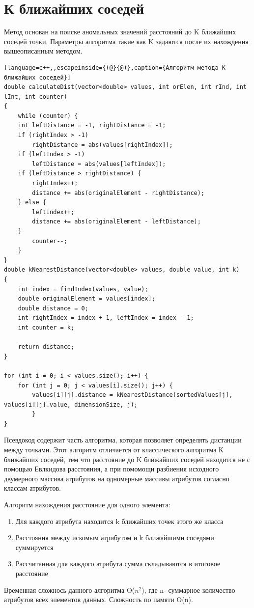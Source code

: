 \section{К ближайших соседей}
Метод основан на поиске аномальных значений расстояний до K ближайших соседей точки. Параметры алгоритма такие как K задаются после их нахождения вышеописанным методом.
\begin{lstlisting}[language=c++,,escapeinside={(@}{@)},caption={Алгоритм метода К ближайших соседей}] 
double calculateDist(vector<double> values, int orElen, int rInd, int lInt, int counter)
{
	while (counter) {
	int leftDistance = -1, rightDistance = -1;
	if (rightIndex > -1)
		rightDistance = abs(values[rightIndex]);
	if (leftIndex > -1)
		leftDistance = abs(values[leftIndex]);
	if (leftDistance > rightDistance) {
		rightIndex++;
		distance += abs(originalElement - rightDistance);
	} else {
		leftIndex++;
		distance += abs(originalElement - leftDistance);
	}
		counter--;
	}
}
double kNearestDistance(vector<double> values, double value, int k)
{
	int index = findIndex(values, value);
	double originalElement = values[index];
	double distance = 0;
	int rightIndex = index + 1, leftIndex = index - 1;
	int counter = k;

	return distance;
}

for (int i = 0; i < values.size(); i++) {
	for (int j = 0; j < values[i].size(); j++) {
		values[i][j].distance = kNearestDistance(sortedValues[j], values[i][j].value, dimensionSize, j);
		}
}
\end{lstlisting}
Псевдокод содержит часть алгоритма, которая позволяет определять дистанции между точками. Этот алгоритм отличается от классического алгоритма К ближайших соседей, тем что расстояние до K ближайших соседей находится не с помощью Евлкидова расстояния, а при помомощи разбиения исходного двумерного массива атрибутов на одномерные массивы атрибутов согласно классам атрибутов.

 Алгоритм нахождения расстояние для одного элемента:
 
\begin{enumerate}
	\item Для каждого атрибута находится k ближайших точек этого же класса
	\item Расстояния между искомым атрибутом и k ближайшими соседями суммируется
	\item Рассчитанная для каждого атрибута сумма складываются в итоговое расстояние
\end{enumerate}
Временная сложнось данного алгоритма O($n^2$), где n- суммарное количество атрибутов всех элементов данных. Сложность по памяти O(n).
